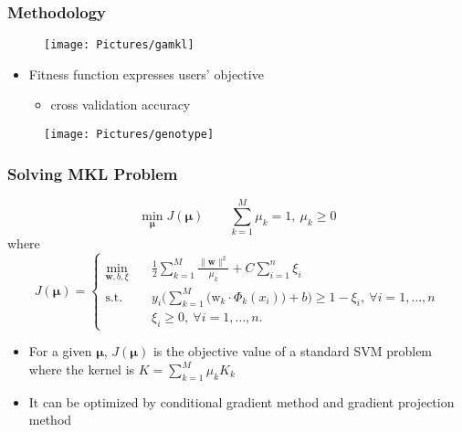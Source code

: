 \documentclass{beamer}
\begin{document}
	\begin{frame}
		\frametitle{Methodology}
		\begin{minipage}{0.45\textwidth}
			\begin{figure}
				\texttt{[image: Pictures/gamkl]}
			\end{figure}
		\end{minipage}\hfill
		\begin{minipage}{0.45\textwidth}
			\begin{itemize}
				\item Fitness function expresses users' \alert{objective}
				\begin{itemize}
					\item cross validation accuracy
				\end{itemize}
			\end{itemize}
			\begin{figure}
				\texttt{[image: Pictures/genotype]}
			\end{figure}
		\end{minipage}
	\end{frame}
	
	\begin{frame}[label=sec3]
		\frametitle{Solving MKL Problem}
		\hyperlink{primal<3>}{\beamergotobutton{Go to primal form}}
		\begin{equation*}\label{eqn:mklmin}
        	\min_{\boldsymbol{\mu}} J(\boldsymbol{\mu})\qquad \sum_{k=1}^M \mu_k=1,~\mu_k\geq0
    	\end{equation*}
    where
    	\begin{equation*}
    		J(\boldsymbol{\mu})=
    		\begin{cases}
    			\displaystyle\min_{\mathbf{w},b,\xi}\quad &\displaystyle\frac{1}{2}\sum_{k=1}^M \frac{\|\mathbf{w}\|^2}{\mu_k}+C\sum_{i=1}^n \xi_i\\
    			\displaystyle\text{s.t.}&\displaystyle y_i\Big(\sum_{k=1}^M \big(\text{w}_k\cdot\Phi_k(x_i)\big)+b\Big)\geq 1-\xi_i,~\forall i=1,\ldots,n\\
    			&\displaystyle\xi_i\geq0,~\forall i=1,\ldots,n.
    		\end{cases}
    	\end{equation*}
    	\pause
    	\begin{itemize}
			\item For a given $\boldsymbol{\mu}$, $J(\boldsymbol{\mu})$ is the objective value of a standard SVM problem where the kernel is $K=\sum_{k=1}^M \mu_k K_k$
			\pause
			\item<3-> It can be optimized by conditional gradient method and gradient projection method
		\end{itemize}
	\end{frame}	
	
\end{document}
